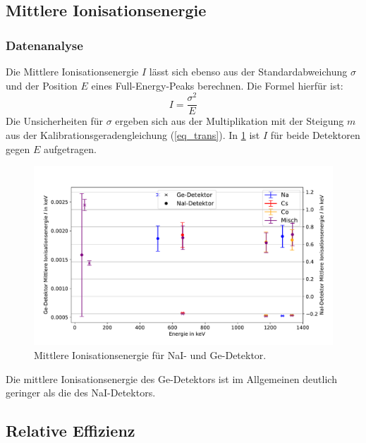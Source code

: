 \documentclass[
	a4paper,
	12pt,
	pagesize,
	ngerman
]{scrartcl}
\begin{document}
\subsection{Mittlere Ionisationsenergie}
\subsubsection{Datenanalyse}
Die Mittlere Ionisationsenergie $I$ lässt sich ebenso aus der Standardabweichung $\sigma$ und der Position $E$ eines Full-Energy-Peaks berechnen.
Die Formel hierfür ist:
\begin{equation}
	I = \frac{\sigma^2}{E}
\end{equation}
Die Unsicherheiten für $\sigma$ ergeben sich aus der Multiplikation mit der Steigung $m$ aus der Kalibrationsgeradengleichung (\ref{eq_trans}).
In \cref{fg_ionisation} ist $I$ für beide Detektoren gegen $E$ aufgetragen.


	\begin{figure}[H]
			\includegraphics[width= 1 \linewidth]{img/ion}
			\caption{
			Mittlere Ionisationsenergie für NaI- und Ge-Detektor.
			}
			\label{fg_ionisation}
	\end{figure}


Die mittlere Ionisationsenergie des Ge-Detektors ist im Allgemeinen deutlich geringer als die des NaI-Detektors. %

\subsection{Relative Effizienz}
\end{document}

